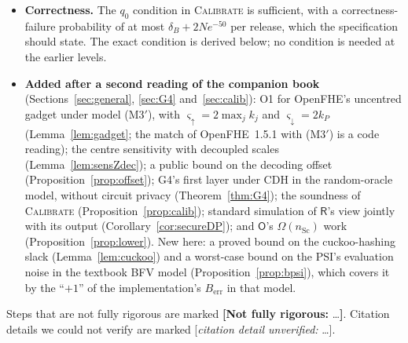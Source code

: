 \documentclass[11pt]{article}
\theoremstyle{definition}
\theoremstyle{plain}
\newcommand{\Rp}{\mathsf{R}}
\newcommand{\Op}{\mathsf{O}}
\newcommand{\gap}[1]{\textcolor{red!65!black}{\textbf{[Not fully rigorous:} #1\textbf{]}}}
\newcommand{\unsure}[1]{\textcolor{orange!75!black}{[\emph{citation detail unverified:} #1]}}
\begin{document}
\begin{itemize}[nosep]
  \item \textbf{Correctness.} The $q_0$ condition in \textsc{Calibrate} is sufficient, with a correctness-failure probability of at most $\delta_B+2Ne^{-50}$ per release, which the specification should state. The exact condition is derived below; no condition is needed at the earlier levels.
  \item \textbf{Added after a second reading of the companion book} (Sections~\ref{sec:general}, \ref{sec:G4} and~\ref{sec:calib}): O1 for OpenFHE's uncentred gadget under model (M3$'$), with $\varsigma_\uparrow=2\max_jk_j$ and $\varsigma_\downarrow=2k_P$ (Lemma~\ref{lem:gadget}; the match of OpenFHE~1.5.1 with (M3$'$) is a code reading); the centre sensitivity with decoupled scales (Lemma~\ref{lem:sensZdec}); a public bound on the decoding offset (Proposition~\ref{prop:offset}); G4's first layer under CDH in the random-oracle model, without circuit privacy (Theorem~\ref{thm:G4}); the soundness of \textsc{Calibrate} (Proposition~\ref{prop:calib}); standard simulation of $\Rp$'s view jointly with its output (Corollary~\ref{cor:secureDP}); and $\Op$'s $\Omega(n_{\mathrm{Sc}})$ work (Proposition~\ref{prop:lower}). New here: a proved bound on the cuckoo-hashing slack (Lemma~\ref{lem:cuckoo}) and a worst-case bound on the PSI's evaluation noise in the textbook BFV model (Proposition~\ref{prop:bpsi}), which covers it by the ``$+1$'' of the implementation's $B_{\mathrm{err}}$ in that model.
\end{itemize}
Steps that are not fully rigorous are marked \gap{\dots}. Citation details we could not verify are marked \unsure{\dots}.

\tableofcontents
\end{document}
